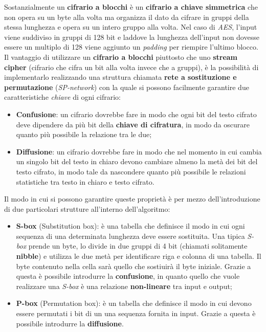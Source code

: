 Sostanzialmente un \textbf{cifrario a blocchi} è un \textbf{cifrario a chiave simmetrica} che non opera su un byte alla volta ma organizza il dato da cifrare in gruppi della stessa lunghezza e opera su un intero gruppo alla volta. Nel caso di \emph{AES}, l'input viene suddiviso in gruppi di 128 bit e laddove la lunghezza dell'input non dovesse essere un multiplo di 128 viene aggiunto un \emph{padding} per riempire l'ultimo blocco.\\
Il vantaggio di utilizzare un \textbf{cifrario a blocchi} piuttosto che uno \textbf{stream cipher} (cifrario che cifra un bit alla volta invece che a gruppi), è la possibilità di implementarlo realizzando una struttura chiamata \textbf{rete a sostituzione e permutazione} (\emph{SP-network}) \cite{wikipedia_aes} con la quale si possono facilmente garantire due caratteristiche \emph{chiave} di ogni cifrario:
\begin{itemize}
    \item \textbf{Confusione}: un cifrario dovrebbe fare in modo che ogni bit del testo cifrato deve dipendere da più bit della \textbf{chiave di cifratura}, in modo da oscurare quanto più possibile la relazione tra le due;
    \item \textbf{Diffusione}: un cifrario dovrebbe fare in modo che nel momento in cui cambia un singolo bit del testo in chiaro devono cambiare almeno la metà dei bit del testo cifrato, in modo tale da nascondere quanto più possibile le relazioni statistiche tra testo in chiaro e testo cifrato. \cite{wikipedia_confusion}
\end{itemize}

Il modo in cui si possono garantire queste proprietà è per mezzo dell'introduzione di due particolari strutture all'interno dell'algoritmo:
\begin{itemize}
    \item \textbf{S-box} (Substitution box): è una tabella che definisce il modo in cui ogni sequenza di una determinata lunghezza deve essere sostituita. Una tipica \emph{S-box} prende un byte, lo divide in due gruppi di 4 bit (chiamati solitamente \textbf{nibble}) e utilizza le due metà per identificare riga e colonna di una tabella. Il byte contenuto nella cella sarà quello che sostiuirà il byte iniziale. Grazie a questa è possibile introdurre la \textbf{confusione}, in quanto quello che vuole realizzare una \emph{S-box} è una relazione \textbf{non-lineare} tra input e output; \cite{wikipedia_s-box}
    \item \textbf{P-box} (Permutation box): è un tabella che definisce il modo in cui devono essere permutati i bit di un una sequenza fornita in input. Grazie a questa è possibile introdurre la \textbf{diffusione}. \cite{wikipedia_p-box}
\end{itemize}

